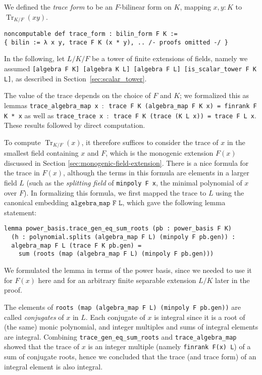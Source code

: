 \documentclass[sn-mathphys]{sn-jnl}%
\newcommand{\lean}[1]{\texttt{#1}\xspace}
\DeclareMathOperator{\Tr}{Tr}
\begin{document}
We defined the \emph{trace form} to be an $F$-bilinear form on $K$, mapping $x, y : K$ to $\Tr_{K/F}(xy)$.
\begin{lstlisting}
noncomputable def trace_form : bilin_form F K :=
{ bilin := λ x y, trace F K (x * y), .. /- proofs omitted -/ }
\end{lstlisting}

In the following, let $L / K / F$ be a tower of finite extensions of fields, namely we assumed \lean{[algebra F K] [algebra K L] [algebra F L] [is\_scalar\_tower F K L]}, as described in Section~\ref{sec:scalar_tower}.

The value of the trace depends on the choice of $F$ and $K$; we formalized this as lemmas \lean{trace\_algebra\_map x $:$ trace F K (algebra\_map F K x) = finrank F K * x} as well as \lean{trace\_trace x $:$ trace F K (trace (K L x)) = trace F L x}.
These results followed by direct computation.

To compute $\Tr_{K/F}(x)$, it therefore suffices to consider the trace of $x$ in the smallest field containing $x$ and $F$, which is the monogenic extension $F(x)$ discussed in Section \ref{sec:monogenic-field-extension}.
There is a nice formula for the trace in $F(x)$, although the terms in this formula are elements in a larger field $L$
(such as the \emph{splitting field} of \lean{minpoly F x}, the minimal polynomial of $x$ over $F$).
In formalizing this formula, we first mapped the trace to $L$ using the canonical embedding $\lean{algebra\_map F L}$,
which gave the following lemma statement:
\begin{lstlisting}
lemma power_basis.trace_gen_eq_sum_roots (pb : power_basis F K)
  (h : polynomial.splits (algebra_map F L) (minpoly F pb.gen)) :
  algebra_map F L (trace F K pb.gen) =
    sum (roots (map (algebra_map F L) (minpoly F pb.gen)))
\end{lstlisting}
We formulated the lemma in terms of the power basis, since we needed to use it for $F(x)$ here
and for an arbitrary finite separable extension $L / K$ later in the proof.

The elements of \lean{roots (map (algebra\_map F L) (minpoly F pb.gen))} are called \emph{conjugates} of $x$ in $L$.
Each conjugate of $x$ is integral since it is a root of (the same) monic polynomial,
and integer multiples and sums of integral elements are integral.
Combining \lean{trace\_gen\_eq\_sum\_roots} and \lean{trace\_algebra\_map} showed that the trace of $x$ is an integer multiple (namely \lean{finrank F(x) L}) of a sum of conjugate roots, hence we concluded that the trace (and trace form) of an integral element is also integral.
\end{document}
